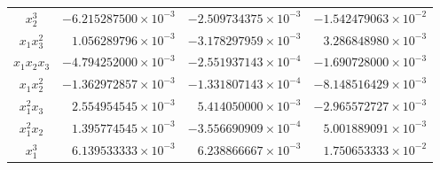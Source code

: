 \documentclass[withoutpreface,bwprint]{cumcmthesis}
\begin{document}
\begin{table}[H]
\begin{tabular}{crrr}
$x_2^3$         & $-6.215287500\times10^{-3}$ & $-2.509734375\times10^{-3}$ & $-1.542479063\times10^{-2}$\\
$x_1x_3^2$      & $ 1.056289796\times10^{-3}$ & $-3.178297959\times10^{-3}$ & $ 3.286848980\times10^{-3}$\\
$x_1x_2x_3$     & $-4.794252000\times10^{-3}$ & $-2.551937143\times10^{-4}$ & $-1.690728000\times10^{-3}$\\
$x_1x_2^2$      & $-1.362972857\times10^{-3}$ & $-1.331807143\times10^{-4}$ & $-8.148516429\times10^{-3}$\\
$x_1^2x_3$      & $ 2.554954545\times10^{-3}$ & $ 5.414050000\times10^{-3}$ & $-2.965572727\times10^{-3}$\\
$x_1^2x_2$      & $ 1.395774545\times10^{-3}$ & $-3.556690909\times10^{-4}$ & $ 5.001889091\times10^{-3}$\\
$x_1^3$         & $ 6.139533333\times10^{-3}$ & $ 6.238866667\times10^{-3}$ & $ 1.750653333\times10^{-2}$\\
\bottomrule
\end{tabular}
\end{table}
\end{document}
